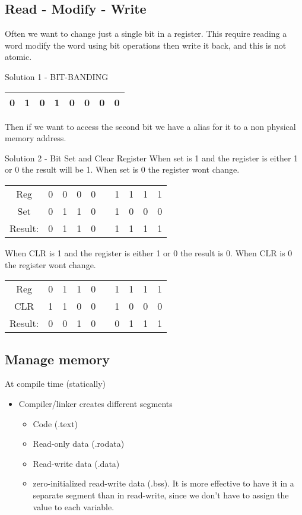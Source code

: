 \subsection{Read - Modify - Write}
Often we want to change just a single bit in a register. This require reading a word
modify the word using bit operations then write it back, and this is not atomic.

\begin{exampleblock}{Solution 1 - BIT-BANDING}
    \begin{tabular}{|c|c|c|c|c|c|c|c|}
        \hline
        0 & 1 & 0 & 1 & 0 & 0 & 0 & 0 \\
        \hline
    \end{tabular}

    Then if we want to access the second bit we have a alias for it 
    to a non physical memory address.
\end{exampleblock}

\begin{exampleblock}{Solution 2 - Bit Set and Clear Register}
    When set is 1 and the register is either 1 or 0 the result will be 1.
    When set is 0 the register wont change.\newline
    \begin{tabular}{ c c c c c c c c c c }
            Reg & 0 & 0 & 0 & 0 &  & 1 & 1 & 1 & 1  \\
            Set & 0 & 1 & 1 & 0 &  & 1 & 0 & 0 & 0  \\
        Result: & 0 & 1 & 1 & 0 &  & 1 & 1 & 1 & 1 
    \end{tabular}

    When CLR is 1 and the register is either 1 or 0 the result is 0.
    When CLR is 0 the register wont change.\newline
    \begin{tabular}{ c c c c c c c c c c }
            Reg & 0 & 1 & 1 & 0 &  & 1 & 1 & 1 & 1  \\
            CLR & 1 & 1 & 0 & 0 &  & 1 & 0 & 0 & 0  \\
        Result: & 0 & 0 & 1 & 0 &  & 0 & 1 & 1 & 1 
    \end{tabular}
\end{exampleblock}


\subsection{Manage memory}
At compile time (statically)
\begin{itemize}
    \item Compiler/linker creates different segments
    \begin{itemize}
        \item Code (.text)
        \item Read-only data (.rodata)
        \item Read-write data (.data)
        \item zero-initialized read-write data (.bss). 
        It is more effective to have it in a separate segment than in read-write,
        since we don't have to assign the value to each variable.
    \end{itemize}
\end{itemize}

